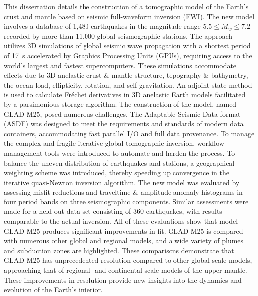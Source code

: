 This dissertation details the construction of a tomographic model of the Earth's crust and mantle
based on seismic full-waveform inversion (FWI).
The new model involves a database of 1,480 earthquakes in the magnitude range $5.5\le M_w \le 7.2$ recorded by more than 11,000 global
seismographic stations.
The approach utilizes 3D simulations of global seismic wave propagation with a shortest period of 17~s accelerated by Graphics Processing Units (GPUs),
requiring access to the world's largest and fastest supercomputers.
These simulations accommodate effects due to 3D anelastic crust \& mantle structure, topography \& bathymetry, the ocean load, ellipticity, rotation, and self-gravitation.
An adjoint-state method is used to calculate Fr\'echet derivatives in 3D anelastic Earth models
facilitated by a parsimonious storage algorithm.
The construction of the model,
named GLAD-M25, posed numerous challenges.
The Adaptable Seismic Data format (ASDF)
was designed to meet the requirements and standards
of modern data containers,
accommodating fast parallel I/O and full data provenance.
To manage the complex and fragile iterative global tomographic inversion,
workflow management tools were introduced to automate and harden the process.
To balance the uneven distribution of earthquakes and stations,
a geographical weighting scheme was introduced, thereby speeding up convergence in the
iterative quasi-Newton inversion algorithm.
The new model was evaluated by assessing misfit reductions and traveltime \& amplitude anomaly histograms in four period bands on three seismographic components.
Similar assessments were made for a held-out data set consisting of 360 earthquakes,
with results comparable to the actual inversion.
All of these evaluations show that model GLAD-M25 produces significant improvements in fit.
GLAD-M25 is compared with numerous other global and regional models,
and a wide variety of plumes and subduction zones are highlighted.
These comparisons demonstrate that GLAD-M25 has unprecedented resolution compared to other global-scale models, approaching that of regional- and continental-scale models of the upper mantle.
These improvements in resolution provide new insights into the dynamics and evolution of the Earth's interior.